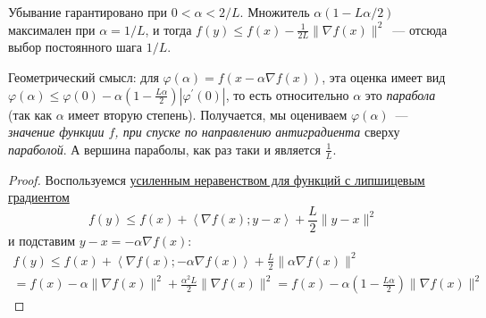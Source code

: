 

\begin{remark}
  Убывание гарантировано при $0 < \alpha < 2/L$. Множитель $\alpha(1 - L\alpha/2)$ максимален при $\alpha = 1/L$, и тогда $f(y) \le f(x) - \frac{1}{2L}\|\nabla f(x)\|^2$~--- отсюда выбор постоянного шага $1/L$.
\end{remark}

\begin{remark}
  Геометрический смысл: для $\varphi(\alpha) = f(x - \alpha \nabla f(x))$, эта оценка имеет вид $\varphi(\alpha) \le \varphi(0) - \alpha \left( 1- \frac{L\alpha}{2}  \right) |\varphi^{\prime}(0)|$, то есть относительно $\alpha$ это \emph{парабола} (так как $\alpha$ имеет вторую степень). Получается, мы оцениваем $\varphi(\alpha)$~--- \emph{значение функции $f$, при спуске по направлению антиградиента} сверху \emph{параболой}.  А вершина параболы, как раз таки и является $\frac{1}{L}$.
\end{remark}

\begin{proof}
  Воспользуемся \hyperref[note:379E4CAD-A44B-4631-8DAF-F3DC708EAEDE]{усиленным неравенством для функций с липшицевым градиентом}
  \[
  f(y) \le f(x) + \left\langle \nabla f(x); y-x \right\rangle + \frac{L}{2} \|y-x\|^2
  \]
  и подставим $y - x = -\alpha \nabla f(x)$:
  \begin{multline*}
  f(y) \le f(x) + \left\langle \nabla f(x); -\alpha \nabla f(x) \right\rangle + \frac{L}{2} \|\alpha \nabla f(x)\|^2 \\
  = f(x) - \alpha \|\nabla f(x)\|^2 + \frac{\alpha^2 L}{2} \|\nabla f(x)\|^2 = f(x) - \alpha \left( 1 - \frac{L\alpha}{2} \right) \|\nabla f(x)\|^2
  \end{multline*}
\end{proof}

